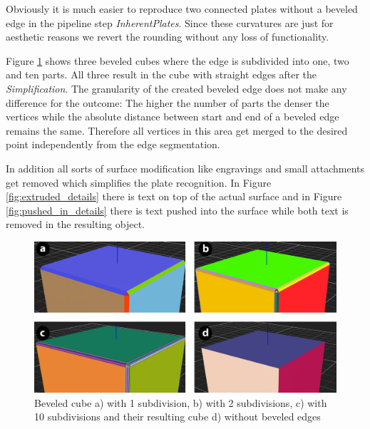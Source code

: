 \documentclass[../ClassicThesis.tex]{subfiles}
\begin{document}
Obviously it is much easier to reproduce two connected plates without a beveled edge in the pipeline step \emph{InherentPlates}. Since these curvatures are just for aesthetic reasons we revert the rounding without any loss of functionality.

Figure \ref{fig:beveled} shows three beveled cubes where the edge is subdivided into one, two and ten parts. All three result in the cube with straight edges after the \emph{Simplification}. The granularity of the created beveled edge does not make any difference for the outcome:
The higher the number of parts the denser the vertices while the absolute distance between start and end of a beveled edge remains the same. Therefore all vertices in this area get merged to the desired point independently from the edge segmentation.

In addition all sorts of surface modification like engravings and small attachments get removed which simplifies the plate recognition. In Figure \ref{fig:extruded_details} there is text on top of the actual surface and in Figure \ref{fig:pushed_in_details} there is text pushed into the surface while both text is removed in the resulting object.


\begin{figure}
\includegraphics[width=1.0\columnwidth]{Images/04-approx-welding-beveled-2.png}
\caption{Beveled cube a) with 1 subdivision, b) with 2 subdivisions, c) with 10 subdivisions and their resulting cube d) without beveled edges}
\label{fig:beveled}
\end{figure}
\end{document}
